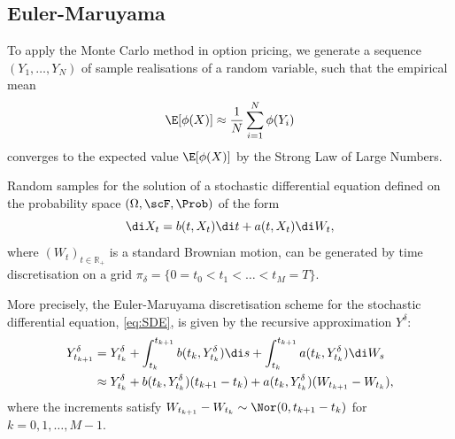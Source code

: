 \subsection{Euler-Maruyama}

To apply the Monte Carlo method in option pricing, we generate a sequence \((Y_1, \dots, Y_N)\) of sample realisations of a random variable, such that the empirical mean
\begin{equation}
    \E [\phi(X)] \approx \frac{1}{N} \sum_{i=1}^{N} \phi(Y_i)
    \label{eq:MonteCarloEstimator}
\end{equation}
converges to the expected value \(\E [\phi(X)]\) by the Strong Law of Large Numbers.

Random samples for the solution of a stochastic differential equation defined on the probability space \((\Omega, \scF, \Prob)\) of the form
\begin{equation}
    \di X_t = b(t, X_t) \di t + a(t, X_t) \di W_t,
    \label{eq:SDE}
\end{equation}
where \((W_t)_{t\in\mathbb{R}_+}\) is a standard Brownian motion, can be generated by time discretisation on a grid \(\pi_{\delta} = \{0 = t_0 < t_1 < \dots < t_M = T\}\).

More precisely, the Euler-Maruyama discretisation scheme for the stochastic differential equation, \cref{eq:SDE}, is given by the recursive approximation \(Y^\delta\):
\begin{align}
    Y_{t_{k+1}}^{\delta} &= Y_{t_{k}}^{\delta} + \int_{t_{k}}^{t_{k+1}} b(t_k, Y^\delta_{t_k}) \di s + \int_{t_{k}}^{t_{k+1}} a(t_k, Y^\delta_{t_k}) \di W_s \notag \\
    &\approx Y_{t_{k}}^{\delta} + b(t_k, Y_{t_{k}}^{\delta}) (t_{k+1} - t_k) + a(t_k, Y_{t_{k}}^{\delta}) (W_{t_{k+1}} - W_{t_k}),
    \label{eq:EulerScheme}
\end{align}
where the increments satisfy \(W_{t_{k+1}} - W_{t_k} \sim \Nor (0,t_{k+1} - t_{k})\) for \(k = 0,1,\dots,M-1\).

